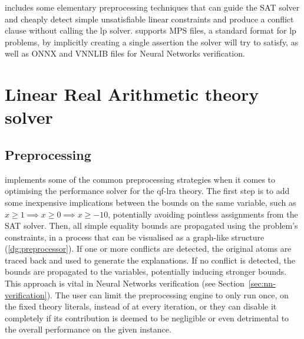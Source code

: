 \documentclass[runningheads]{llncs}
\begin{document}
\dlinear includes some elementary preprocessing techniques that can guide the SAT solver and cheaply detect simple unsatisfiable linear constraints and produce a conflict clause without calling the \gls{lp} solver.
\dlinear supports MPS files, a standard format for \gls{lp} problems, by implicitly creating a single assertion the solver will try to satisfy, as well as ONNX and VNNLIB files for Neural Networks verification.

\section{Linear Real Arithmetic theory solver}
\label{sec:lra-theory-solver}

\subsection*{Preprocessing}
\label{sec:preprocessing}

\dlinear implements some of the common preprocessing strategies when it comes to optimising the performance solver for the \gls{qf-lra} theory.
The first step is to add some inexpensive implications between the bounds on the same variable, such as $x \ge 1 \implies x \ge 0 \implies x \ge -10$, potentially avoiding pointless assignments from the SAT solver.
Then, all simple equality bounds are propagated using the problem's constraints, in a process that can be visualised as a graph-like structure (\autoref{dg:preprocessor}).
If one or more conflicts are detected, the original atoms are traced back and used to generate the explanations.
If no conflict is detected, the bounds are propagated to the variables, potentially inducing stronger bounds.
This approach is vital in Neural Networks verification (see Section~\ref{sec:nn-verification}).
The user can limit the preprocessing engine to only run once, on the fixed theory literals, instead of at every iteration, or they can disable it completely if its contribution is deemed to be negligible or even detrimental to the overall performance on the given instance.
\end{document}
